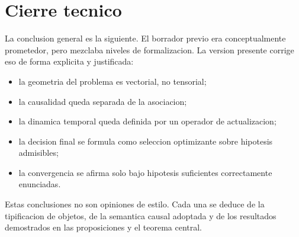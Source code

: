 \documentclass[12pt,a4paper]{article}
\theoremstyle{definition}
\theoremstyle{plain}
\theoremstyle{remark}
\begin{document}
\section{Cierre tecnico}

La conclusion general es la siguiente. El borrador previo era conceptualmente prometedor, pero mezclaba niveles de formalizacion. La version presente corrige eso de forma explicita y justificada:
\begin{itemize}[leftmargin=1.5em]
    \item la geometria del problema es vectorial, no tensorial;
    \item la causalidad queda separada de la asociacion;
    \item la dinamica temporal queda definida por un operador de actualizacion;
    \item la decision final se formula como seleccion optimizante sobre hipotesis admisibles;
    \item la convergencia se afirma solo bajo hipotesis suficientes correctamente enunciadas.
\end{itemize}

Estas conclusiones no son opiniones de estilo. Cada una se deduce de la tipificacion de objetos, de la semantica causal adoptada y de los resultados demostrados en las proposiciones y el teorema central.
\end{document}
